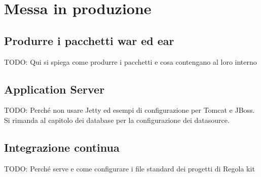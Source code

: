 \chapter{Messa in produzione}\label{chap:produzione}

\section{Produrre i pacchetti war ed ear}
TODO: Qui si spiega come produrre i pacchetti e cosa contengano al loro interno

\section{Application Server}\label{sec:datasource}
TODO: Perché non usare Jetty ed esempi di configurazione per Tomcat e JBoss. Si rimanda al capitolo dei database per la configurazione dei datasource.


\section{Integrazione continua}
TODO: Perché serve e come configurare i file standard dei progetti di Regola kit